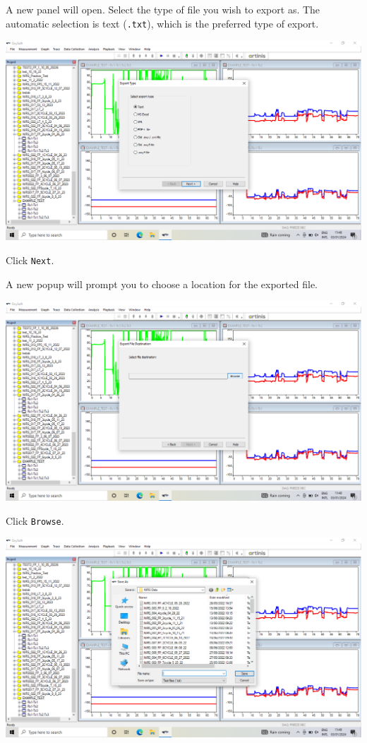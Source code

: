 \documentclass[
]{book}
\begin{document}
A new panel will open. Select the type of file you wish to export as. The automatic selection is text (\texttt{.txt}), which is the preferred type of export.

\includegraphics[width=1\linewidth]{images/exportmeasurement/2_selecttypeofexport}

Click \texttt{Next}.

A new popup will prompt you to choose a location for the exported file.

\includegraphics[width=1\linewidth]{images/exportmeasurement/3_choosefilelocation}

Click \texttt{Browse}.

\includegraphics[width=1\linewidth]{images/exportmeasurement/4_filelocationpopup}
\end{document}
